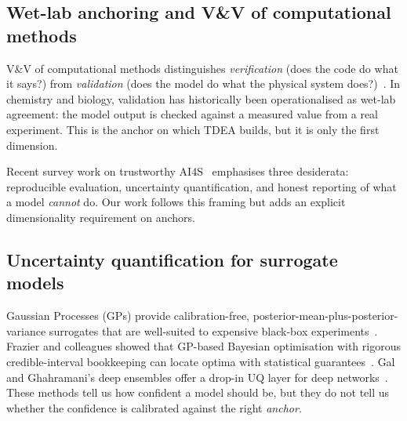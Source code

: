 \documentclass[review,3p]{elsarticle}
\begin{document}
\subsection{Wet-lab anchoring and V\&V of computational methods}

V\&V of computational methods distinguishes \emph{verification} (does the code do what it says?) from \emph{validation} (does the model do what the physical system does?)~\cite{barbastathis2007design}. In chemistry and biology, validation has historically been operationalised as wet-lab agreement: the model output is checked against a measured value from a real experiment. This is the anchor on which TDEA builds, but it is only the first dimension.

Recent survey work on trustworthy AI4S~\cite{mcmillan2020applications,williamson2021machine} emphasises three desiderata: reproducible evaluation, uncertainty quantification, and honest reporting of what a model \emph{cannot} do. Our work follows this framing but adds an explicit dimensionality requirement on anchors.

\subsection{Uncertainty quantification for surrogate models}

Gaussian Processes (GPs) provide calibration-free, posterior-mean-plus-posterior-variance surrogates that are well-suited to expensive black-box experiments~\cite{rasmussen2006gplm}. Frazier and colleagues showed that GP-based Bayesian optimisation with rigorous credible-interval bookkeeping can locate optima with statistical guarantees~\cite{frazier2008active}. Gal and Ghahramani's deep ensembles offer a drop-in UQ layer for deep networks~\cite{gal2016ensembles}. These methods tell us how confident a model should be, but they do not tell us whether the confidence is calibrated against the right \emph{anchor}.
\end{document}
